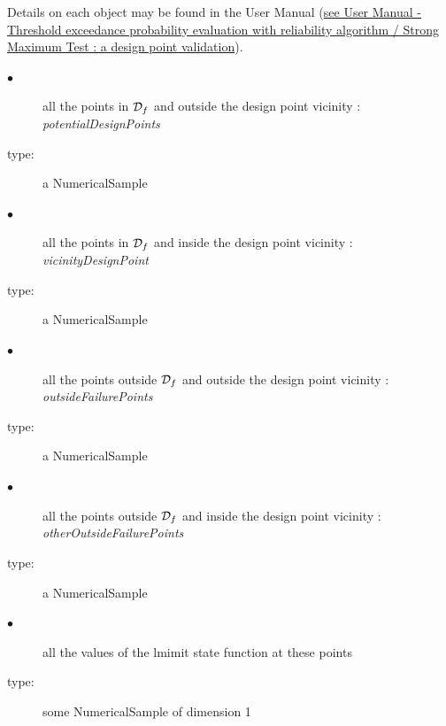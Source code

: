 Details on each object may be found in the User Manual  (\href{OpenTURNS_UserManual_TUI.pdf}{see User Manual - Threshold exceedance probability evaluation with reliability algorithm / Strong Maximum Test : a design point validation}).\\

{
  \begin{description}
  \item[$\bullet$] all the points in ${\mathcal D}_f$ and outside the design point vicinity : {\em potentialDesignPoints}
  \item[type:] a NumericalSample
  \item[$\bullet$] all the points in ${\mathcal D}_f$ and inside the design point vicinity : {\em vicinityDesignPoint}
  \item[type:] a NumericalSample
  \item[$\bullet$] all the points outside ${\mathcal D}_f$ and outside the design point vicinity : {\em outsideFailurePoints}
  \item[type:] a NumericalSample
  \item[$\bullet$] all the points outside ${\mathcal D}_f$ and inside the design point vicinity : {\em otherOutsideFailurePoints}
  \item[type:] a NumericalSample
  \item[$\bullet$] all the values of the lmimit state function at these points
  \item[type:] some NumericalSample of dimension 1
  \end{description}
}

\textspace\\



